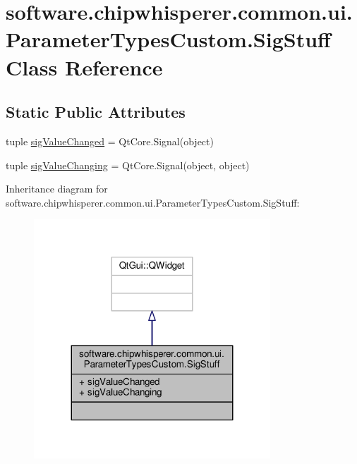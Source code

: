 \hypertarget{classsoftware_1_1chipwhisperer_1_1common_1_1ui_1_1ParameterTypesCustom_1_1SigStuff}{}\section{software.\+chipwhisperer.\+common.\+ui.\+Parameter\+Types\+Custom.\+Sig\+Stuff Class Reference}
\label{classsoftware_1_1chipwhisperer_1_1common_1_1ui_1_1ParameterTypesCustom_1_1SigStuff}
\subsection*{Static Public Attributes}
\begin{DoxyCompactItemize}
\item 
tuple \hyperlink{classsoftware_1_1chipwhisperer_1_1common_1_1ui_1_1ParameterTypesCustom_1_1SigStuff_abe6c95b57673bf64e1b2c5285f995cbb}{sig\+Value\+Changed} = Qt\+Core.\+Signal(object)
\item 
tuple \hyperlink{classsoftware_1_1chipwhisperer_1_1common_1_1ui_1_1ParameterTypesCustom_1_1SigStuff_a9aca9a683aeb4c93f7780143d00074ac}{sig\+Value\+Changing} = Qt\+Core.\+Signal(object, object)
\end{DoxyCompactItemize}


Inheritance diagram for software.\+chipwhisperer.\+common.\+ui.\+Parameter\+Types\+Custom.\+Sig\+Stuff\+:\nopagebreak
\begin{figure}[H]
\begin{center}
\leavevmode
\includegraphics[width=251pt]{d0/d60/classsoftware_1_1chipwhisperer_1_1common_1_1ui_1_1ParameterTypesCustom_1_1SigStuff__inherit__graph}
\end{center}
\end{figure}


